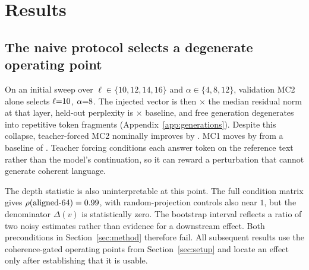 \section{Results}\label{sec:results}

\subsection{The naive protocol selects a degenerate operating point}\label{sec:broken}

On an initial sweep over $\ell \in \{10, 12, 14, 16\}$ and $\alpha \in \{4, 8, 12\}$, validation MC2 alone selects $\ell{=}10$, $\alpha{=}8$. The injected vector is then \NaiveNormRatio$\times$ the median residual norm at that layer, held-out perplexity is \NaivePplRatio$\times$ baseline, and free generation degenerates into repetitive token fragments (Appendix~\ref{app:generations}).
\newpage
Despite this collapse, teacher-forced MC2 nominally improves by \NaiveDecDelta{} \NaiveDecDeltaCI{}. MC1 moves by \NaiveDecDeltaMcOne{} \NaiveDecDeltaMcOneCI{} from a baseline of \BaseMcOne. Teacher forcing conditions each answer token on the reference text rather than the model's continuation, so it can reward a perturbation that cannot generate coherent language.

The depth statistic is also uninterpretable at this point. The full condition matrix gives $\rho(\text{aligned-64}) = 0.99$, with random-projection controls also near $1$, but the denominator $\Delta(v)$ is statistically zero. The bootstrap interval \NaiveRhoAlSixtyFourCI{} reflects a ratio of two noisy estimates rather than evidence for a downstream effect. Both preconditions in Section~\ref{sec:method} therefore fail. All subsequent results use the coherence-gated operating points from Section~\ref{sec:setup} and locate an effect only after establishing that it is usable.

\begin{table}[h]
\centering
\small
\setlength{\tabcolsep}{16pt}
\renewcommand{\arraystretch}{1.15}

\caption{Headline condition matrix on the \NTest{} held-out test questions; the shared unsteered baseline has MC2 $= \BaseMcTwo$. $\rho$ is the fraction of each family's steering effect that survives projection, with paired-bootstrap 95\% intervals. CAA's $\Delta$MC2 interval \DecTestDeltaCI{} contains zero, so its $\rho$ values are shown but not interpreted; percentile ratio intervals are not valid confidence sets when the denominator is not bounded away from zero. The mass-mean interval is bounded away from zero ($\Delta$MC2 \MmTestDelta{} \MmTestDeltaCI). Figure~\ref{fig:forest} shows the paired deltas.}
\label{tab:matrix}
\end{table}

